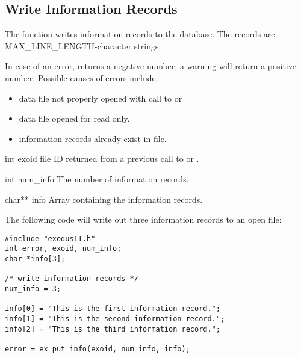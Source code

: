 \subsection{Write Information Records}

The function  writes information records to the
database. The records are MAX_LINE_LENGTH-character strings.

In case of an error,  returns a negative number;
a warning will return a positive number. Possible causes of errors
include:

\begin{itemize}

 \item data file not properly opened with call to 
 or 

 \item data file opened for read only.

 \item information records already exist in file.
\end{itemize}



\begin{parameters}
\item[{int exoid \R{}}]
\exo{} file ID returned from a previous call to  or
.


\item[{int num_info \R{}}]
The number of information records.


\item[{char** info \R{}}]
Array containing the information records.
\end{parameters}

The following code will write out three information records 
to an open \exo{} file:

\begin{lstlisting}
#include "exodusII.h"
int error, exoid, num_info;
char *info[3];

/* write information records */
num_info = 3;

info[0] = "This is the first information record.";
info[1] = "This is the second information record.";
info[2] = "This is the third information record.";

error = ex_put_info(exoid, num_info, info);
\end{lstlisting}

